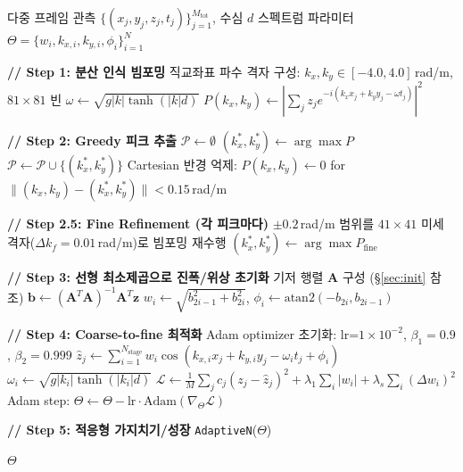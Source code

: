 \documentclass[11pt]{report}
\numberwithin{equation}{chapter}
\numberwithin{figure}{chapter}
\numberwithin{table}{chapter}
\newcommand{\WS}{\textsc{WaveSplat}}
\begin{document}
\begin{algorithm}[H]
\caption{\WS{} 초기화 알고리즘}
\label{alg:init}
\begin{algorithmic}[1]
\REQUIRE 다중 프레임 관측 $\{(x_j, y_j, z_j, t_j)\}_{j=1}^{M_{\text{tot}}}$, 수심 $d$
\ENSURE 스펙트럼 파라미터 $\Theta = \{w_i, k_{x,i}, k_{y,i}, \phi_i\}_{i=1}^{N}$

\STATE \textbf{// Step 1: 분산 인식 빔포밍}
\STATE 직교좌표 파수 격자 구성: $k_x, k_y \in [-4.0, 4.0]$\,rad/m, $81 \times 81$ 빈
  \STATE $\omega \leftarrow \sqrt{g|k|\tanh(|k|d)}$ 
  \STATE $P(k_x, k_y) \leftarrow \left|\sum_j z_j e^{-i(k_x x_j + k_y y_j - \omega t_j)}\right|^2$
\ENDFOR

\STATE \textbf{// Step 2: Greedy 피크 추출}
\STATE $\mathcal{P} \leftarrow \emptyset$
  \STATE $(k_x^*, k_y^*) \leftarrow \arg\max P$
  \STATE $\mathcal{P} \leftarrow \mathcal{P} \cup \{(k_x^*, k_y^*)\}$
  \STATE Cartesian 반경 억제: $P(k_x, k_y) \leftarrow 0$ for $\|(k_x,k_y)-(k_x^*,k_y^*)\| < 0.15$\,rad/m
\ENDWHILE

\STATE \textbf{// Step 2.5: Fine Refinement (각 피크마다)}
  \STATE $\pm0.2$\,rad/m 범위를 $41\times41$ 미세 격자($\Delta k_f=0.01$\,rad/m)로 빔포밍 재수행
  \STATE $(k_x^*, k_y^*) \leftarrow \arg\max P_{\text{fine}}$ 
\ENDFOR

\STATE \textbf{// Step 3: 선형 최소제곱으로 진폭/위상 초기화}
\STATE 기저 행렬 $\mathbf{A}$ 구성 (§\ref{sec:init} 참조)
\STATE $\mathbf{b} \leftarrow (\mathbf{A}^T\mathbf{A})^{-1}\mathbf{A}^T\mathbf{z}$
  \STATE $w_i \leftarrow \sqrt{b_{2i-1}^2 + b_{2i}^2}$, \quad
         $\phi_i \leftarrow \text{atan2}(-b_{2i}, b_{2i-1})$
\ENDFOR

\STATE \textbf{// Step 4: Coarse-to-fine 최적화}
  \STATE Adam optimizer 초기화: lr=$1\times10^{-2}$, $\beta_1=0.9$, $\beta_2=0.999$
    \STATE $\hat{z}_j \leftarrow \sum_{i=1}^{N_{\text{stage}}} w_i \cos(k_{x,i}x_j + k_{y,i}y_j - \omega_i t_j + \phi_i)$
    \STATE $\omega_i \leftarrow \sqrt{g|k_i|\tanh(|k_i|d)}$ 
    \STATE $\mathcal{L} \leftarrow \frac{1}{M}\sum_j c_j(z_j - \hat{z}_j)^2 + \lambda_1\sum_i|w_i| + \lambda_s\sum_i(\Delta w_i)^2$
    \STATE Adam step: $\Theta \leftarrow \Theta - \text{lr} \cdot \text{Adam}(\nabla_\Theta \mathcal{L})$
  \ENDFOR
\ENDFOR

\STATE \textbf{// Step 5: 적응형 가지치기/성장}
\STATE \texttt{AdaptiveN}($\Theta$) 

\RETURN $\Theta$
\end{algorithmic}
\end{algorithm}
\end{document}
